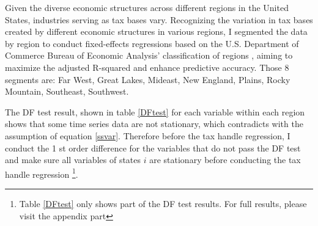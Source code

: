 
Given the diverse economic structures across different regions in the United States, industries serving as tax bases vary. Recognizing the variation in tax bases created by different economic structures in various regions, I segmented the data by region to conduct fixed-effects regressions based on the U.S. Department of Commerce Bureau of Economic Analysis' classification of regions , aiming to maximize the adjusted R-squared and enhance predictive accuracy. Those 8 segments are: Far West, Great Lakes, Mideast, New England,	Plains,	Rocky Mountain,	Southeast, Southwest.

The DF test result, shown in table \ref{DFtest} for each variable within each region shows that some time series data are not stationary, which contradicts with the assumption of equation \ref{ssvar}. Therefore before the tax handle regression, I conduct the 1 st order difference for the variables that do not pass the DF test and make sure all variables of states $i$ are stationary before conducting the tax handle regression \footnote{Table \ref{DFtest} only shows part of the DF test results. For full results, please visit the appendix part}.

